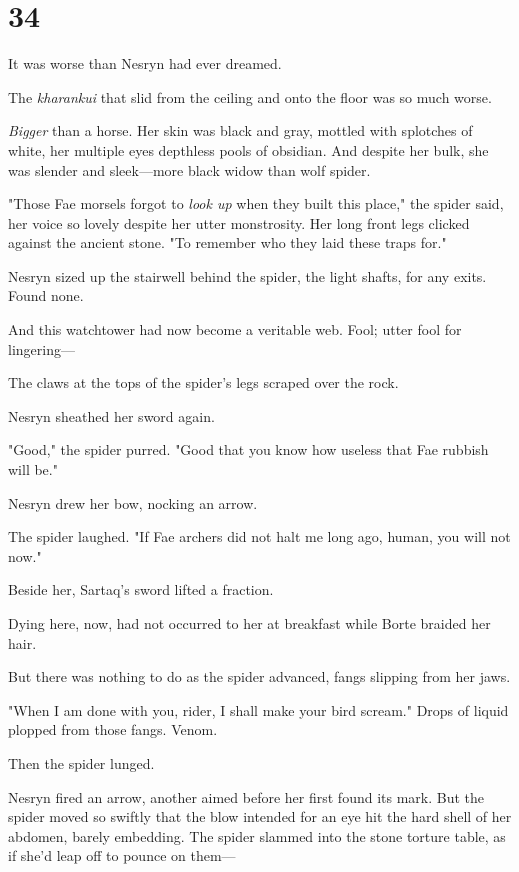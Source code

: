 
\chapter{34}

It was worse than Nesryn had ever dreamed.

The \emph{kharankui} that slid from the ceiling and onto the floor was so much worse.

\emph{Bigger} than a horse.
Her skin was black and gray, mottled with splotches of white, her multiple eyes depthless pools of obsidian.
And despite her bulk, she was slender and sleek---more black widow than wolf spider.

"Those Fae morsels forgot to \emph{look up} when they built this place," the spider said, her voice so lovely despite her utter monstrosity.
Her long front legs clicked against the ancient stone.
"To remember who they laid these traps for."

Nesryn sized up the stairwell behind the spider, the light shafts, for any exits.
Found none.

And this watchtower had now become a veritable web.
Fool; utter fool for lingering---

The claws at the tops of the spider's legs scraped over the rock.

Nesryn sheathed her sword again.

"Good," the spider purred.
"Good that you know how useless that Fae rubbish will be."

Nesryn drew her bow, nocking an arrow.

The spider laughed.
"If Fae archers did not halt me long ago, human, you will not now."

Beside her, Sartaq's sword lifted a fraction.

Dying here, now, had not occurred to her at breakfast while Borte braided her hair.

But there was nothing to do as the spider advanced, fangs slipping from her jaws.

"When I am done with you, rider, I shall make your bird scream."
Drops of liquid plopped from those fangs.
Venom.

Then the spider lunged.

Nesryn fired an arrow, another aimed before her first found its mark.
But the spider moved so swiftly that the blow intended for an eye hit the hard shell of her abdomen, barely embedding.
The spider slammed into the stone torture table, as if she'd leap off to pounce on them---

